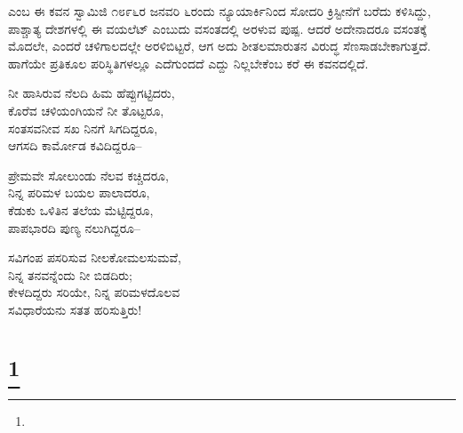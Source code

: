  ಎಂಬ ಈ ಕವನ ಸ್ವಾಮಿಜಿ ೧೮೯೬ರ ಜನವರಿ ೬ರಂದು ನ್ಯೂಯಾರ್ಕಿನಿಂದ ಸೋದರಿ ಕ್ರಿಸ್ಟೀನೆಗೆ ಬರೆದು ಕಳಿಸಿದ್ದು, ಪಾಶ್ಚಾತ್ಯ ದೇಶಗಳಲ್ಲಿ ಈ ವಯಲೆಟ್ ಎಂಬುದು ವಸಂತದಲ್ಲಿ ಅರಳುವ ಪುಷ್ಪ. ಆದರೆ ಅದೇನಾದರೂ ವಸಂತಕ್ಕೆ ಮೊದಲೇ, ಎಂದರೆ ಚಳಿಗಾಲದಲ್ಲೇ ಅರಳಿಬಿಟ್ಟರೆ, ಆಗ ಅದು ಶೀತಲಮಾರುತನ ವಿರುದ್ಧ ಸೆಣಸಾಡಬೇಕಾಗುತ್ತದೆ. ಹಾಗೆಯೇ ಪ್ರತಿಕೂಲ ಪರಿಸ್ಥಿತಿಗಳಲ್ಲೂ ಎದೆಗುಂದದೆ ಎದ್ದು ನಿಲ್ಲಬೇಕೆಂಬ ಕರೆ ಈ ಕವನದಲ್ಲಿದೆ.

\begin{myquote}
ನೀ ಹಾಸಿರುವ ನೆಲದಿ ಹಿಮ ಹೆಪ್ಪುಗಟ್ಟಿದರು,\\ಕೊರೆವ ಚಳಿಯಂಗಿಯನೆ ನೀ ತೊಟ್ಟರೂ,\\ಸಂತಸವನೀವ ಸಖ ನಿನಗೆ ಸಿಗದಿದ್ದರೂ,\\ಆಗಸದಿ ಕಾರ್ಮೋಡ ಕವಿದಿದ್ದರೂ–
\end{myquote}

\begin{myquote}
ಪ್ರೇಮವೇ ಸೋಲುಂಡು ನೆಲವ ಕಚ್ಚಿದರೂ,\\ನಿನ್ನ ಪರಿಮಳ ಬಯಲ ಪಾಲಾದರೂ,\\ಕೆಡುಕು ಒಳಿತಿನ ತಲೆಯ ಮೆಟ್ಟಿದ್ದರೂ,\\ಪಾಪಭಾರದಿ ಪುಣ್ಯ ನಲುಗಿದ್ದರೂ–
\end{myquote}

\begin{myquote}
ಸವಿಗಂಪ ಪಸರಿಸುವ ನೀಲಕೋಮಲಸುಮವೆ,\\ನಿನ್ನ ತನವನ್ನೆಂದು ನೀ ಬಿಡದಿರು;\\ಕೇಳದಿದ್ದರು ಸರಿಯೇ, ನಿನ್ನ ಪರಿಮಳದೊಲವ\\ಸವಿಧಾರೆಯನು ಸತತ ಹರಿಸುತ್ತಿರು!
\end{myquote}

\selecteng

\chapter[THE CUP]{\protect\footnote{}}

\begin{myquote}
\end{myquote}

\begin{myquote}
\end{myquote}

